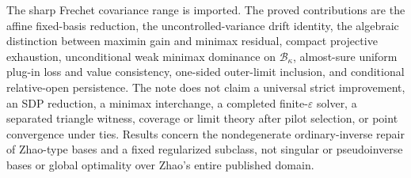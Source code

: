 The sharp Frechet covariance range is imported.  The proved contributions are the affine fixed-basis reduction, the uncontrolled-variance drift identity, the algebraic distinction between maximin gain and minimax residual, compact projective exhaustion, unconditional weak minimax dominance on \(\mathcal B_\kappa\), almost-sure uniform plug-in loss and value consistency, one-sided outer-limit inclusion, and conditional relative-open persistence.  The note does not claim a universal strict improvement, an SDP reduction, a minimax interchange, a completed finite-\(\varepsilon\) solver, a separated triangle witness, coverage or limit theory after pilot selection, or point convergence under ties.  Results concern the nondegenerate ordinary-inverse repair of Zhao-type bases and a fixed regularized subclass, not singular or pseudoinverse bases or global optimality over Zhao's entire published domain.